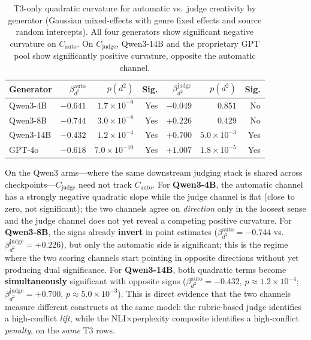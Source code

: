 \documentclass[sigconf,nonacm]{acmart}
\begin{document}
\begin{table}[t]
\centering
\small
\begin{tabular}{lrrrrrr}
\toprule
Generator & $\beta_{d^2}^{\mathrm{auto}}$ & $p(d^2)$ & Sig. & $\beta_{d^2}^{\mathrm{judge}}$ & $p(d^2)$ & Sig. \\
\midrule
Qwen3-4B  & $-0.641$ & $1.7{\times}10^{-9}$ & Yes & $-0.049$ & $0.851$ & No \\
Qwen3-8B  & $-0.744$ & $3.0{\times}10^{-8}$ & Yes & $+0.226$ & $0.429$ & No \\
Qwen3-14B & $-0.432$ & $1.2{\times}10^{-4}$ & Yes & $+0.700$ & $5.0{\times}10^{-3}$ & Yes \\
GPT-4o    & $-0.618$ & $7.0{\times}10^{-10}$ & Yes & $+1.007$ & $1.8{\times}10^{-5}$ & Yes \\
\bottomrule
\end{tabular}
\caption{T3-only quadratic curvature for automatic vs.\ judge creativity by generator (Gaussian mixed-effects with genre fixed effects and source random intercepts). All four generators show significant negative curvature on $C_{\mathrm{auto}}$. On $C_{\mathrm{judge}}$, Qwen3-14B and the proprietary GPT pool show significantly positive curvature, opposite the automatic channel.}
\label{tab:judge_auto_divergence}
\end{table}

On the Qwen3 arms---where the same downstream judging stack is shared across checkpoints---$C_{\mathrm{judge}}$ need not track $C_{\mathrm{auto}}$.
For \textbf{Qwen3-4B}, the automatic channel has a strongly negative quadratic slope while the judge channel is flat (close to zero, not significant); the two channels agree on \emph{direction} only in the loosest sense and the judge channel does not yet reveal a competing positive curvature.
For \textbf{Qwen3-8B}, the signs already \textbf{invert} in point estimates ($\beta_{d^2}^{\mathrm{auto}}{=}{-}0.744$ vs.\ $\beta_{d^2}^{\mathrm{judge}}{=}{+}0.226$), but only the automatic side is significant; this is the regime where the two scoring channels start pointing in opposite directions without yet producing dual significance.
For \textbf{Qwen3-14B}, both quadratic terms become \textbf{simultaneously} significant with opposite signs ($\beta_{d^2}^{\mathrm{auto}}{=}{-}0.432$, $p{\approx}1.2{\times}10^{-4}$; $\beta_{d^2}^{\mathrm{judge}}{=}{+}0.700$, $p{\approx}5.0{\times}10^{-3}$). This is direct evidence that the two channels measure different constructs at the same model: the rubric-based judge identifies a high-conflict \emph{lift}, while the NLI$\times$perplexity composite identifies a high-conflict \emph{penalty}, on the \emph{same} T3 rows.
\end{document}
